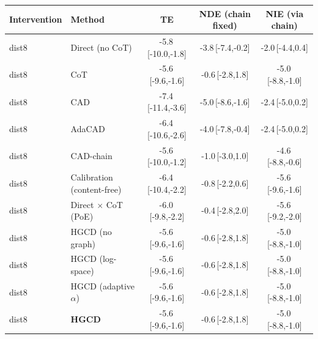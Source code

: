 \begin{tabular}{llccc}
\toprule
Intervention & Method & TE & NDE (chain fixed) & NIE (via chain) \\
\midrule
dist8 & Direct (no CoT) & -5.8\,{\scriptsize[-10.0,-1.8]} & -3.8\,{\scriptsize[-7.4,-0.2]} & -2.0\,{\scriptsize[-4.4,0.4]} \\
dist8 & CoT & -5.6\,{\scriptsize[-9.6,-1.6]} & -0.6\,{\scriptsize[-2.8,1.8]} & -5.0\,{\scriptsize[-8.8,-1.0]} \\
dist8 & CAD & -7.4\,{\scriptsize[-11.4,-3.6]} & -5.0\,{\scriptsize[-8.6,-1.6]} & -2.4\,{\scriptsize[-5.0,0.2]} \\
dist8 & AdaCAD & -6.4\,{\scriptsize[-10.6,-2.6]} & -4.0\,{\scriptsize[-7.8,-0.4]} & -2.4\,{\scriptsize[-5.0,0.2]} \\
dist8 & CAD-chain & -5.6\,{\scriptsize[-10.0,-1.2]} & -1.0\,{\scriptsize[-3.0,1.0]} & -4.6\,{\scriptsize[-8.8,-0.6]} \\
dist8 & Calibration (content-free) & -6.4\,{\scriptsize[-10.4,-2.2]} & -0.8\,{\scriptsize[-2.2,0.6]} & -5.6\,{\scriptsize[-9.6,-1.6]} \\
dist8 & Direct $\times$ CoT (PoE) & -6.0\,{\scriptsize[-9.8,-2.2]} & -0.4\,{\scriptsize[-2.8,2.0]} & -5.6\,{\scriptsize[-9.2,-2.0]} \\
dist8 & HGCD (no graph) & -5.6\,{\scriptsize[-9.6,-1.6]} & -0.6\,{\scriptsize[-2.8,1.8]} & -5.0\,{\scriptsize[-8.8,-1.0]} \\
dist8 & HGCD (log-space) & -5.6\,{\scriptsize[-9.6,-1.6]} & -0.6\,{\scriptsize[-2.8,1.8]} & -5.0\,{\scriptsize[-8.8,-1.0]} \\
dist8 & HGCD (adaptive $\alpha$) & -5.6\,{\scriptsize[-9.6,-1.6]} & -0.6\,{\scriptsize[-2.8,1.8]} & -5.0\,{\scriptsize[-8.8,-1.0]} \\
dist8 & \textbf{HGCD} & -5.6\,{\scriptsize[-9.6,-1.6]} & -0.6\,{\scriptsize[-2.8,1.8]} & -5.0\,{\scriptsize[-8.8,-1.0]} \\
\bottomrule
\end{tabular}
